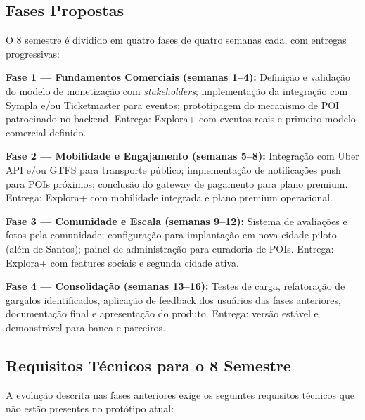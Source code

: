 \documentclass[12pt, a4paper]{article}
\begin{document}
\subsection{Fases Propostas}

O 8\textordmasculine{} semestre \'e dividido em quatro fases de quatro semanas cada, com entregas progressivas:

\textbf{Fase 1 --- Fundamentos Comerciais (semanas 1--4):} Defini\c{c}\~ao e valida\c{c}\~ao do modelo de monetiza\c{c}\~ao com \textit{stakeholders}; implementa\c{c}\~ao da integra\c{c}\~ao com Sympla e/ou Ticketmaster para eventos; prototipagem do mecanismo de POI patrocinado no backend. Entrega: Explora+ com eventos reais e primeiro modelo comercial definido.

\textbf{Fase 2 --- Mobilidade e Engajamento (semanas 5--8):} Integra\c{c}\~ao com Uber API e/ou GTFS para transporte p\'ublico; implementa\c{c}\~ao de notifica\c{c}\~oes push para POIs pr\'oximos; conclus\~ao do gateway de pagamento para plano premium. Entrega: Explora+ com mobilidade integrada e plano premium operacional.

\textbf{Fase 3 --- Comunidade e Escala (semanas 9--12):} Sistema de avalia\c{c}\~oes e fotos pela comunidade; configura\c{c}\~ao para implanta\c{c}\~ao em nova cidade-piloto (al\'em de Santos); painel de administra\c{c}\~ao para curadoria de POIs. Entrega: Explora+ com features sociais e segunda cidade ativa.

\textbf{Fase 4 --- Consolida\c{c}\~ao (semanas 13--16):} Testes de carga, refatora\c{c}\~ao de gargalos identificados, aplica\c{c}\~ao de feedback dos usu\'arios das fases anteriores, documenta\c{c}\~ao final e apresenta\c{c}\~ao do produto. Entrega: vers\~ao est\'avel e demonstr\'avel para banca e parceiros.

\subsection{Requisitos T\'ecnicos para o 8\textordmasculine{} Semestre}

A evolu\c{c}\~ao descrita nas fases anteriores exige os seguintes requisitos t\'ecnicos que n\~ao est\~ao presentes no prot\'otipo atual:
\end{document}
